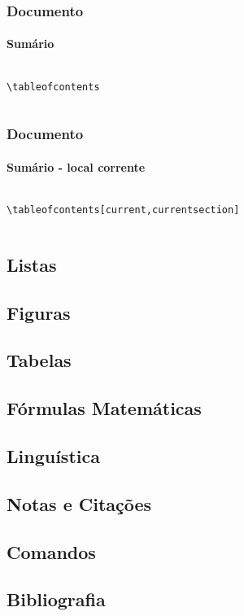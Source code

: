 \begin{frame}[fragile]
\frametitle{Documento}
\framesubtitle{Sumário}
  \scriptsize
  \begin{columns}[c]
  \begin{verbatim}
\tableofcontents
  \end{verbatim} 
  \begin{fmpage}{\textwidth}
  \scriptsize
  \tableofcontents
  \end{fmpage}
  \end{columns}
\end{frame}


\begin{frame}[fragile]
\frametitle{Documento}
\framesubtitle{Sumário - local corrente}
  \scriptsize
  \begin{columns}[c]
  \begin{verbatim}
\tableofcontents[current,currentsection]
  \end{verbatim} 
  \begin{fmpage}{\textwidth}
  \scriptsize
  \end{fmpage}
  \end{columns}
\end{frame}


\subsection{Listas}\label{sec:listas}


\subsection{Figuras}\label{sec:figuras}


\subsection{Tabelas}\label{sec:tabelas}


\subsection{Fórmulas Matemáticas}\label{sec:formulasmat}


\subsection{Linguística}\label{sec:linguistica}


\subsection{Notas e Citações}\label{sec:notascita}


\subsection{Comandos}\label{sec:comandos}


\subsection{Bibliografia}\label{sec:bibtex}

